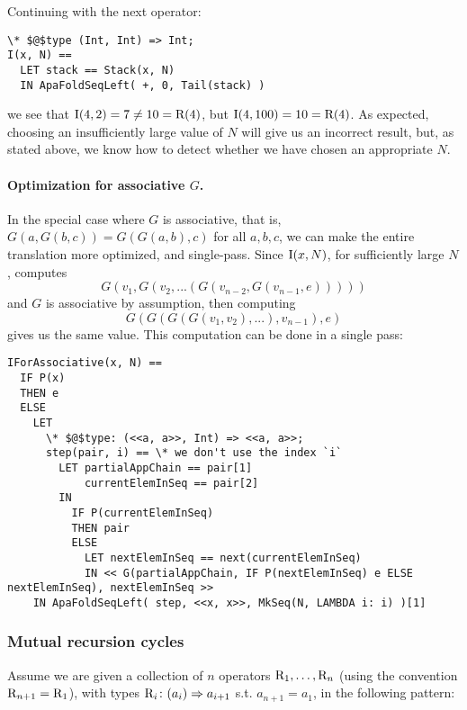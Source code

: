 \noindent Continuing with the next operator:
\begin{lstlisting}[language=tla,columns=fullflexible]
\* $@$type (Int, Int) => Int;
I(x, N) ==
  LET stack == Stack(x, N)
  IN ApaFoldSeqLeft( +, 0, Tail(stack) )
\end{lstlisting}
%
we see that $\mathrm{I}(4, 2) = 7 \ne 10 = \mathrm{R}(4)$, but $\mathrm{I}(4, 100) = 10 = \mathrm{R}(4)$.
As expected, choosing an insufficiently large value of $N$ will give us an incorrect result, but, as stated above, we know how to detect whether we have chosen an appropriate $N$.

\paragraph{ Optimization for associative $G$.}
In the special case where $G$ is associative, that is, $G(a, G(b, c)) = G(G(a, b), c)$ for all $a,b,c$, we can make the entire translation more optimized, and single-pass. Since $\mathrm{I}(x,N)$, for sufficiently large $N$, computes 
\[
G(v_1, G(v_2, ... (G(v_{n-2}, G(v_{n-1}, e)))))
\]
%
and $G$ is associative by assumption, then computing
\[
G(G(G(G(v_1, v_2), ...), v_{n-1}), e)
\]
gives us the same value. This computation can be done in a single pass:
\newpage
\begin{lstlisting}[language=tla,columns=fullflexible]
IForAssociative(x, N) ==
  IF P(x)
  THEN e
  ELSE
    LET 
      \* $@$type: (<<a, a>>, Int) => <<a, a>>;
      step(pair, i) == \* we don't use the index `i`
        LET partialAppChain == pair[1]
            currentElemInSeq == pair[2]
        IN
          IF P(currentElemInSeq)
          THEN pair
          ELSE
            LET nextElemInSeq == next(currentElemInSeq)
            IN << G(partialAppChain, IF P(nextElemInSeq) e ELSE nextElemInSeq), nextElemInSeq >>
    IN ApaFoldSeqLeft( step, <<x, x>>, MkSeq(N, LAMBDA i: i) )[1]
\end{lstlisting}

\subsubsection{ Mutual recursion cycles}

Assume we are given a collection of $n$ operators $\mathrm{R}_1, \dots, \mathrm{R}_n$ (using the convention $\mathrm{R}_{n+1} = \mathrm{R}_1$), with types $\mathrm{R}_i\colon (a_i) \Rightarrow a_{i+1}$ s.t. $a_{n+1} = a_1$, in the following pattern:

